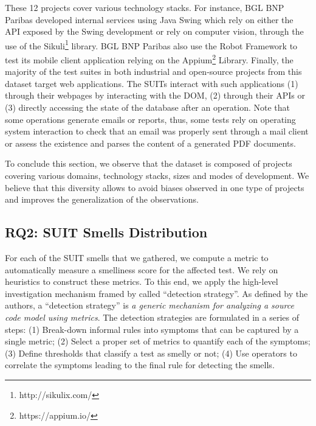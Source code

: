 These 12 projects cover various technology stacks. For instance, BGL BNP Paribas developed internal services using Java Swing which rely on either the API exposed by the Swing development or rely on computer vision, through the use of the Sikuli\footnote{http://sikulix.com/} library. BGL BNP Paribas also use the Robot Framework to test its mobile client application relying on the Appium\footnote{https://appium.io/} Library. Finally, the majority of the test suites in both industrial and open-source projects from this dataset target web applications. The SUITs interact with such applications (1) through their webpages by interacting with the DOM, (2) through their APIs or (3) directly accessing the state of the database after an operation. Note that some operations generate emails or reports, thus, some tests rely on operating system interaction to check that an email was properly sent through a mail client or assess the existence and parses the content of a generated PDF documents.

To conclude this section, we observe that the dataset is composed of projects covering various domains, technology stacks, sizes and modes of development. We believe that this diversity allows to avoid biases observed in one type of projects and improves the generalization of the observations.

\subsection{RQ2: SUIT Smells Distribution}
\label{sec:smell-detection}

For each of the SUIT smells that we gathered, we compute a metric to automatically measure a smelliness score for the affected test. We rely on heuristics to construct these metrics. To this end, we apply the high-level investigation mechanism framed by \textcite{Marinescu2004} called ``detection strategy''. As defined by the authors, a ``detection strategy'' is \emph{a generic mechanism for analyzing a source code model using metrics}. The detection strategies are formulated in a series of steps: (1) Break-down informal rules into symptoms that can be captured by a single metric; (2) Select a proper set of metrics to quantify each of the symptoms; (3) Define thresholds that classify a test as smelly or not; (4) Use operators to correlate the symptoms leading to the final rule for detecting the smells.

